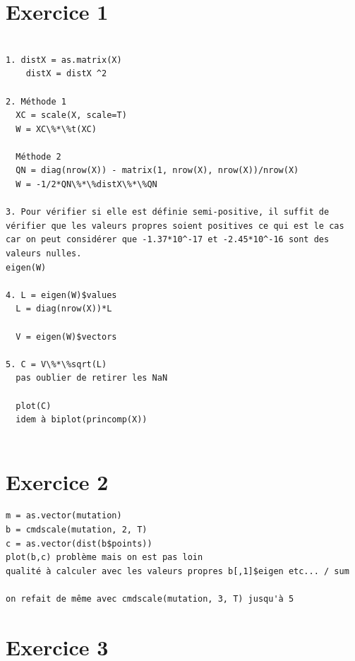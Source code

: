 \documentclass{article}\usepackage[]{graphicx}\usepackage[]{color}
\begin{document}
\section*{Exercice 1}


















\begin{verbatim}

1. distX = as.matrix(X)
    distX = distX ^2
  
2. Méthode 1 
  XC = scale(X, scale=T)
  W = XC\%*\%t(XC)
  
  Méthode 2 
  QN = diag(nrow(X)) - matrix(1, nrow(X), nrow(X))/nrow(X)
  W = -1/2*QN\%*\%distX\%*\%QN
  
3. Pour vérifier si elle est définie semi-positive, il suffit de vérifier que les valeurs propres soient positives ce qui est le cas car on peut considérer que -1.37*10^-17 et -2.45*10^-16 sont des valeurs nulles. 
eigen(W)

4. L = eigen(W)$values
  L = diag(nrow(X))*L
  
  V = eigen(W)$vectors
  
5. C = V\%*\%sqrt(L)
  pas oublier de retirer les NaN
  
  plot(C)
  idem à biplot(princomp(X))
  
\end{verbatim}
  
\section*{Exercice 2}

\begin{verbatim}
m = as.vector(mutation)
b = cmdscale(mutation, 2, T)
c = as.vector(dist(b$points))
plot(b,c) problème mais on est pas loin 
qualité à calculer avec les valeurs propres b[,1]$eigen etc... / sum 

on refait de même avec cmdscale(mutation, 3, T) jusqu'à 5 

\end{verbatim}

\section*{Exercice 3} 
\end{document}
